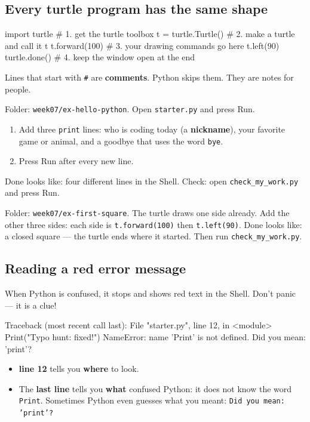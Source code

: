\subsection{Every turtle program has the same shape}
\begin{pycode}
import turtle            # 1. get the turtle toolbox
t = turtle.Turtle()      # 2. make a turtle and call it t
t.forward(100)           # 3. your drawing commands go here
t.left(90)
turtle.done()            # 4. keep the window open at the end
\end{pycode}
Lines that start with \texttt{\#} are \textbf{comments}. Python skips them. They are notes for people.

\begin{exercise}
Folder: \texttt{week07/ex-hello-python}. Open \texttt{starter.py} and press Run.
\begin{enumerate}[leftmargin=1.4em,itemsep=1pt]
  \item Add three \texttt{print} lines: who is coding today (a \textbf{nickname}), your favorite game or animal, and a goodbye that uses the word \texttt{bye}.
  \item Press Run after every new line.
\end{enumerate}
Done looks like: four different lines in the Shell. Check: open \texttt{check\_my\_work.py} and press Run.
\end{exercise}

\begin{exercise}
Folder: \texttt{week07/ex-first-square}. The turtle draws one side already. Add the other three sides: each side is \texttt{t.forward(100)} then \texttt{t.left(90)}.
Done looks like: a closed square --- the turtle ends where it started. Then run \texttt{check\_my\_work.py}.
\end{exercise}

\subsection{Reading a red error message}
When Python is confused, it stops and shows red text in the Shell. Don't panic --- it is a clue!
\begin{outputcode}
Traceback (most recent call last):
  File "starter.py", line 12, in <module>
    Print("Typo hunt: fixed!")
NameError: name 'Print' is not defined. Did you mean: 'print'?
\end{outputcode}
\begin{itemize}[leftmargin=1.2em,itemsep=1pt]
  \item \textbf{line 12} tells you \textbf{where} to look.
  \item The \textbf{last line} tells you \textbf{what} confused Python: it does not know the word \texttt{Print}. Sometimes Python even guesses what you meant: \texttt{Did you mean: 'print'?}
\end{itemize}

